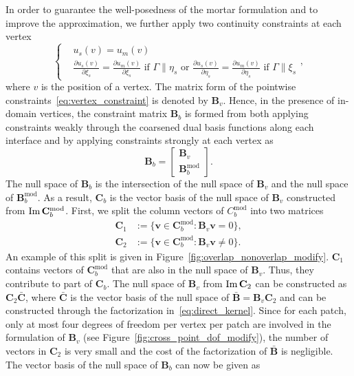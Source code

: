 In order to guarantee the well-posedness of the mortar formulation and to improve the approximation, we further apply two continuity constraints at each vertex
\begin{equation}
  \left\{\begin{split}
    &u_s(v) = u_m(v)\\
    &\frac{\partial u_s(v)}{\partial \xi_s} = \frac{\partial u_m(v)}{\partial \xi_s}\text{ if }\Gamma\parallel\eta_s\text{ or }\frac{\partial u_s(v)}{\partial \eta_s} = \frac{\partial u_m(v)}{\partial \eta_s}\text{ if }\Gamma\parallel\xi_s
  \end{split}\right.,\label{eq:vertex_constraint}
\end{equation}
where $v$ is the position of a vertex. The matrix form of the pointwise constraints~\eqref{eq:vertex_constraint} is denoted by $\mathbf{B}_v$. Hence, in the presence of in-domain vertices, the constraint matrix $\mathbf{B}_b$ is formed from both applying constraints weakly through the coarsened dual basis functions along each interface and by applying constraints strongly at each vertex as
\begin{equation}
  \mathbf{B}_b =
  \begin{bmatrix}
    \mathbf{B}_v \\
    \mathbf{B}^\text{mod}_b
  \end{bmatrix}.
\end{equation}
The null space of $\mathbf{B}_b$ is the intersection of the null space of $\mathbf{B}_v$ and the null space of $\mathbf{B}^\text{mod}_b$. As a result, $\mathbf{C}_b$ is the vector basis of the null space of $\mathbf{B}_v$ constructed from $\operatorname{Im}\mathbf{C}^\text{mod}_b$. First, we split the column vectors of $C^\text{mod}_b$ into two matrices
\begin{equation}
  \begin{split}
    \mathbf{C}_1&:=\{\mathbf{v}\in\mathbf{C}^\text{mod}_b\colon{\mathbf{B}_v\mathbf{v}={0}}\},\\
    \mathbf{C}_2&:=\{\mathbf{v}\in\mathbf{C}^\text{mod}_b\colon{\mathbf{B}_v\mathbf{v}\neq{0}}\}.
  \end{split}
\end{equation}
An example of this split is given in Figure~\ref{fig:overlap_nonoverlap_modify}. $\mathbf{C}_1$ contains vectors of $\mathbf{C}^\text{mod}_b$ that are also in the null space of $\mathbf{B}_v$. Thus, they contribute to part of $\mathbf{C}_b$. The null space of $\mathbf{B}_v$ from $\operatorname{Im} \mathbf{C}_2$ can be constructed as $\mathbf{C}_2\bar{\mathbf{C}}$, where $\bar{\mathbf{C}}$ is the vector basis of the null space of $\bar{\mathbf{B}} = \mathbf{B}_v\mathbf{C}_2$ and can be constructed through the factorization in~\eqref{eq:direct_kernel}. Since for each patch, only at most four degrees of freedom per vertex per patch are involved in the formulation of $\mathbf{B}_v$ (see Figure~\ref{fig:cross_point_dof_modify}), the number of vectors in $\mathbf{C}_2$ is very small and the cost of the factorization of $\bar{\mathbf{B}}$ is negligible. The vector basis of the null space of $\mathbf{B}_b$ can now be given as
